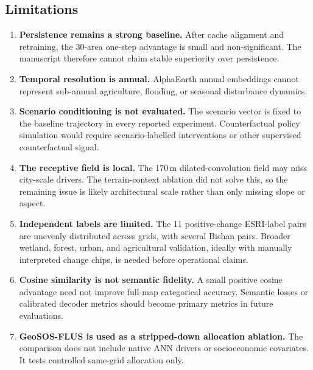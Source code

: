 \documentclass{article}
\begin{document}
\subsection{Limitations}
\label{sec:limitations}

\begin{enumerate}
\item \label{lim:power} \textbf{Persistence remains a strong baseline.} After cache alignment and retraining, the 30-area one-step advantage is small and non-significant. The manuscript therefore cannot claim stable superiority over persistence.

\item \label{lim:temporal} \textbf{Temporal resolution is annual.} AlphaEarth annual embeddings cannot represent sub-annual agriculture, flooding, or seasonal disturbance dynamics.

\item \label{lim:scenario} \textbf{Scenario conditioning is not evaluated.} The scenario vector is fixed to the baseline trajectory in every reported experiment. Counterfactual policy simulation would require scenario-labelled interventions or other supervised counterfactual signal.

\item \label{lim:receptive} \textbf{The receptive field is local.} The 170\,m dilated-convolution field may miss city-scale drivers. The terrain-context ablation did not solve this, so the remaining issue is likely architectural scale rather than only missing slope or aspect.

\item \label{lim:reference} \textbf{Independent labels are limited.} The 11 positive-change ESRI-label pairs are unevenly distributed across grids, with several Bishan pairs. Broader wetland, forest, urban, and agricultural validation, ideally with manually interpreted change chips, is needed before operational claims.

\item \label{lim:cosine_semantic} \textbf{Cosine similarity is not semantic fidelity.} A small positive cosine advantage need not improve full-map categorical accuracy. Semantic losses or calibrated decoder metrics should become primary metrics in future evaluations.

\item \label{lim:flus_scope} \textbf{GeoSOS-FLUS is used as a stripped-down allocation ablation.} The comparison does not include native ANN drivers or socioeconomic covariates. It tests controlled same-grid allocation only.


\end{enumerate}
\end{document}
